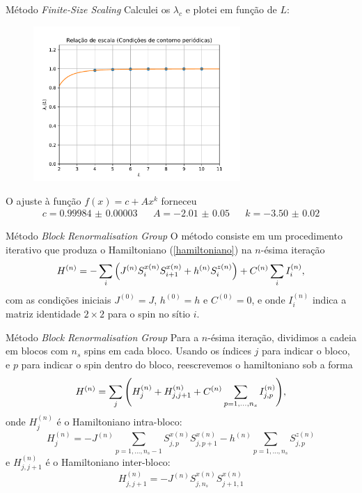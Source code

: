 \documentclass[brazil]{beamer}
\begin{document}
\begin{frame}{Método \textit{Finite-Size Scaling}}
    Calculei os \( \lambda_c \) e plotei em função de \( L \):
    \begin{figure}
        \centering
        \includegraphics[width=0.7\textwidth]{rel_escala_ccp.pdf}
    \end{figure}
    O ajuste à função \( f(x) = c + A x^k \) forneceu
    \begin{align*}
        c = \num{0.99984(3)} & & A = \num{-2.01(5)} & & k = \num{-3.50(2)}
    \end{align*}
\end{frame}

\begin{frame}{Método \textit{Block Renormalisation Group}}
    O método consiste em um procedimento iterativo que produza o Hamiltoniano (\ref{hamiltoniano}) na \( n \)-ésima iteração
    \begin{equation}
        H^{(n)} = - \sum_i \qty( J^{(n)} S_i^{x (n)} S_{i + 1}^{x (n)} + h^{(n)} S_i^{z (n)} ) + C^{(n)} \sum_i I_i^{(n)} ,
    \end{equation}
    com as condições iniciais \( J^{(0)} = J \), \( h^{(0)} = h \) e \( C^{(0)} = 0 \), e onde \( I_i^{(n)} \) indica a matriz identidade \( 2 \times 2 \) para o spin no sítio \( i \).
\end{frame}

\begin{frame}{Método \textit{Block Renormalisation Group}}
    Para a \( n \)-ésima iteração, dividimos a cadeia em blocos com \( n_s \) spins em cada bloco.
    Usando os índices \( j \) para indicar o bloco, e \( p \) para indicar o spin dentro do bloco, reescrevemos o hamiltoniano sob a forma
    \begin{equation}
        H^{(n)} = \sum_j \qty( H_j^{(n)} + H_{j, j + 1}^{(n)} + C^{(n)} \sum_{p = 1, \dotsc , n_s} I_{j, p}^{(n)} ) ,
    \end{equation}
    onde \( H_j^{(n)} \) é o Hamiltoniano intra-bloco:
    \begin{equation}
        H_j^{(n)} = - J^{(n)} \sum_{p = 1, \dotsc, n_s - 1} S_{j, p}^{x(n)} S_{j, p + 1}^{x(n)} - h^{(n)} \sum_{p = 1, \dotsc, n_s} S_{j, p}^{z(n)}
    \end{equation}
    e \( H_{j, j + 1}^{(n)} \) é o Hamiltoniano inter-bloco:
    \begin{equation}
        H_{j, j + 1}^{(n)} = - J^{(n)} S_{j, n_s}^{x(n)} S_{j + 1, 1}^{x(n)}
    \end{equation}
\end{frame}
\end{document}

